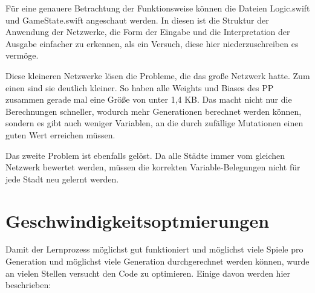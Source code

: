 \documentclass[11pt, twocolumn]{article}
\begin{document}
Für eine genauere Betrachtung der Funktionsweise können die Dateien Logic.swift und GameState.swift angeschaut werden. In diesen ist die Struktur der Anwendung der Netzwerke, die Form der Eingabe und die Interpretation der Ausgabe einfacher zu erkennen, als ein Versuch, diese hier niederzuschreiben es vermöge.

Diese kleineren Netzwerke lösen die Probleme, die das große Netzwerk hatte. Zum einen sind sie deutlich kleiner. So haben alle Weights und Biases des PP zusammen gerade mal eine Größe von unter 1,4 KB. Das macht nicht nur die Berechnungen schneller, wodurch mehr Generationen berechnet werden können, sondern es gibt auch weniger Variablen, an die durch zufällige Mutationen einen guten Wert erreichen müssen.

Das zweite Problem ist ebenfalls gelöst. Da alle Städte immer vom gleichen Netzwerk bewertet werden, müssen die korrekten Variable-Belegungen nicht für jede Stadt neu gelernt werden.

\section{Geschwindigkeitsoptmierungen}
Damit der Lernprozess möglichst gut funktioniert und möglichst viele Spiele pro Generation und möglichst viele Generation durchgerechnet werden können, wurde an vielen Stellen versucht den Code zu optimieren. Einige davon werden hier beschrieben:
\end{document}
